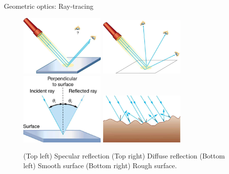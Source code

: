 \documentclass{beamer}
\begin{document}
\begin{frame}{Geometric optics: Ray-tracing}
\begin{figure}
\includegraphics[width=0.375\textwidth]{figures/geo5.png}
\includegraphics[width=0.375\textwidth]{figures/geo3.png}
\includegraphics[width=0.375\textwidth]{figures/geo4.png}
\includegraphics[width=0.375\textwidth]{figures/geo1.png}
\caption{\label{fig:geo1} \footnotesize (Top left) Specular reflection (Top right) Diffuse reflection (Bottom left) Smooth surface (Bottom right) Rough surface.}
\end{figure}
\end{frame}
\end{document}
